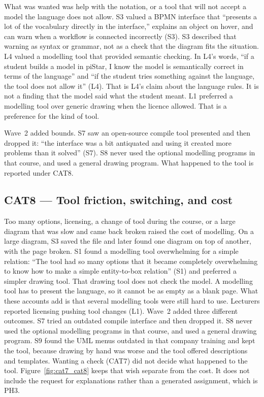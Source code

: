 What was wanted was help with the notation, or a tool that will not accept a model the language does not allow. S3 valued a BPMN interface that ``presents a lot of the vocabulary directly in the interface,'' explains an object on hover, and can warn when a workflow is connected incorrectly (S3). S3 described that warning as syntax or grammar, not as a check that the diagram fits the situation. L4 valued a modelling tool that provided semantic checking. In L4's words, ``if a student builds a model in piStar, I know the model is semantically correct in terms of the language'' and ``if the student tries something against the language, the tool does not allow it'' (L4). That is L4's claim about the language rules. It is not a finding that the model said what the student meant. L1 preferred a modelling tool over generic drawing when the licence allowed. That is a preference for the kind of tool.

Wave~2 added bounds. S7 saw an open-source compile tool presented and then dropped it: ``the interface was a bit antiquated and using it created more problems than it solved'' (S7). S8 never used the optional modelling programs in that course, and used a general drawing program. What happened to the tool is reported under CAT8.

\subsection{CAT8 --- Tool friction, switching, and cost}
\label{sec:cat8}

Too many options, licensing, a change of tool during the course, or a large diagram that was slow and came back broken raised the cost of modelling. On a large diagram, S3 saved the file and later found one diagram on top of another, with the page broken. S1 found a modelling tool overwhelming for a simple relation: ``The tool had so many options that it became completely overwhelming to know how to make a simple entity-to-box relation'' (S1) and preferred a simpler drawing tool. That drawing tool does not check the model. A modelling tool has to present the language, so it cannot be as empty as a blank page. What these accounts add is that several modelling tools were still hard to use. Lecturers reported licensing pushing tool changes (L1). Wave~2 added three different outcomes. S7 tried an outdated compile interface and then dropped it. S8 never used the optional modelling programs in that course, and used a general drawing program. S9 found the UML menus outdated in that company training and kept the tool, because drawing by hand was worse and the tool offered descriptions and templates. Wanting a check (CAT7) did not decide what happened to the tool. Figure~\ref{fig:cat7_cat8} keeps that wish separate from the cost. It does not include the request for explanations rather than a generated assignment, which is PH3.


